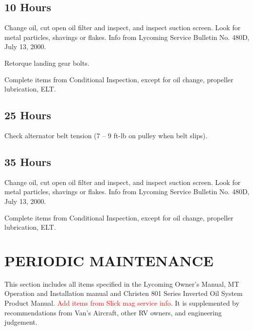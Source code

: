 
\subsection{10 Hours} 
\begin{enumerate*}
	\item Change oil, cut open oil filter and inspect, and inspect suction screen. Look for metal particles, shavings or flakes. Info from Lycoming Service Bulletin No. 480D, July 13, 2000. 
	\item Retorque landing gear bolts.
	\item Complete items from Conditional Inspection, except for oil change, propeller lubrication, ELT. 
\end{enumerate*}

\subsection{25 Hours} 
\begin{enumerate*}
	\item Check alternator belt tension (7 -- 9 ft-lb on pulley when belt slips). 
\end{enumerate*}

\subsection{35 Hours} 
\begin{enumerate*}
	\item Change oil, cut open oil filter and inspect, and inspect suction screen. Look for metal particles, shavings or flakes. Info from Lycoming Service Bulletin No. 480D, July 13, 2000. 
	\item Complete items from Conditional Inspection, except for oil change, propeller lubrication, ELT. 
\end{enumerate*}

\section{PERIODIC MAINTENANCE} This section includes all items specified in the Lycoming Owner's Manual, MT Operation and Installation manual and Christen 801 Series Inverted Oil System Product Manual. \textcolor{red}{Add items from Slick mag service info.} It is supplemented by recommendations from Van's Aircraft, other RV owners, and engineering judgement.

